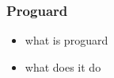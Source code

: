 \subsubsection{Proguard} \label{subsection:counter-obfuscation-solution-proguard}
\begin{itemize}
  \item what is proguard
  \item what does it do
\end{itemize}
